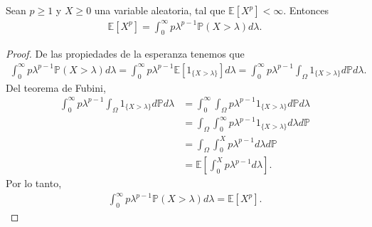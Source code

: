 \begin{lemma}
\label{repint}
Sean $p \geq 1$ y $X \geq 0$ una variable aleatoria, tal que $\mathbb{E}[X^p] < \infty$. Entonces
	\begin{align*}
		\mathbb{E}[X^p] = \int_0^{\infty} p \lambda^{p-1} \mathbb{P}(X > \lambda) d\lambda.
	\end{align*}
\end{lemma}
\begin{proof}
De las propiedades de la esperanza tenemos que
	\begin{align*}
		\int_0^{\infty} p \lambda^{p-1} \mathbb{P}(X > \lambda) d\lambda = \int_0^{\infty} p \lambda^{p-1} \mathbb{E}[1_{\{X > \lambda\}}] d\lambda = \int_0^{\infty} p \lambda^{p-1} \int_{\Omega} 1_{\{X > \lambda\}} d\mathbb{P} d\lambda.
	\end{align*}
Del teorema de Fubini,
	\begin{align*}
		\int_0^{\infty} p \lambda^{p-1} \int_{\Omega} 1_{\{X > \lambda\}} d\mathbb{P} d\lambda & = \int_0^{\infty} \int_{\Omega} p \lambda^{p-1} 1_{\{X > \lambda\}} d\mathbb{P} d\lambda \\
		& = \int_{\Omega} \int_0^{\infty} p \lambda^{p-1} 1_{\{X > \lambda\}} d\lambda d\mathbb{P} \\
		& = \int_{\Omega} \int_0^{X} p \lambda^{p-1} d\lambda d\mathbb{P} \\
		& = \mathbb{E}\left[ \int_0^{X} p \lambda^{p-1} d\lambda \right].
	\end{align*}
	Por lo tanto, 
	\begin{align*}
		\int_0^{\infty} p \lambda^{p-1} \mathbb{P}(X > \lambda) d\lambda = \mathbb{E}[X^p].
	\end{align*}
\end{proof}


